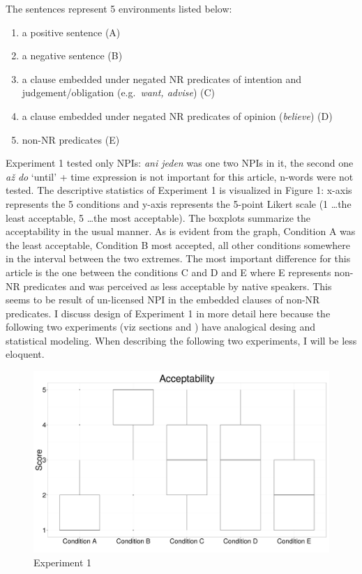 \documentclass[12pt]{scrartcl}
\providecommand{\tightlist}{%
  \setlength{\itemsep}{0pt}\setlength{\parskip}{0pt}}
\begin{document}
The sentences represent 5 environments listed below:

\begin{enumerate}
\def\labelenumi{(\Alph{enumi})}
\tightlist
\item
  a positive sentence (A)
\item
  a negative sentence (B)
\item
  a clause embedded under negated NR predicates of intention and
  judgement/obligation (e.g.~\emph{want, advise}) (C)
\item
  a clause embedded under negated NR predicates of opinion
  (\emph{believe}) (D)
\item
  non-NR predicates (E)
\end{enumerate}

Experiment 1 tested only NPIs: \emph{ani jeden} was one two NPIs in it, the second one \textit{až do} `until' + time expression is not important for this article, n-words were not tested. The descriptive statistics of Experiment 1 is visualized in Figure 1: x-axis represents the 5 conditions and y-axis represents the 5-point Likert scale (1 \ldots the least acceptable, 5 \ldots the most acceptable). The boxplots summarize the acceptability in the usual manner. As is evident from the graph, Condition A was the least acceptable, Condition B most accepted, all other conditions somewhere in the interval between the two extremes. The most important difference for this article is the one between the conditions C and D and E where E represents non-NR predicates and was perceived as less acceptable by native speakers. This seems to be result of un-licensed NPI in the embedded clauses of non-NR predicates. I discuss design of Experiment 1 in more detail here because the following two experiments (viz sections \textbf{} and \textbf{}) have analogical desing and statistical modeling. When describing the following two experiments, I will be less eloquent.

\begin{figure}
\centering
\includegraphics{include/boxplot-exp1.png}
\caption{Experiment 1}
\end{figure}
\end{document}
